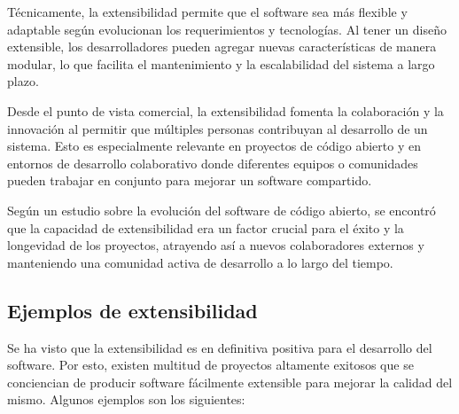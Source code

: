 Técnicamente, la extensibilidad permite que el software sea más flexible y adaptable según evolucionan los requerimientos y tecnologías. Al tener un diseño extensible, los desarrolladores pueden agregar nuevas características de manera modular, lo que facilita el mantenimiento y la escalabilidad del sistema a largo plazo.

Desde el punto de vista comercial, la extensibilidad fomenta la colaboración y la innovación al permitir que múltiples personas contribuyan al desarrollo de un sistema. Esto es especialmente relevante en proyectos de código abierto y en entornos de desarrollo colaborativo donde diferentes equipos o comunidades pueden trabajar en conjunto para mejorar un software compartido.

Según un estudio \citep{mockus2002two} sobre la evolución del software de código abierto, se encontró que la capacidad de extensibilidad era un factor crucial para el éxito y la longevidad de los proyectos, atrayendo así a nuevos colaboradores externos y manteniendo una comunidad activa de desarrollo a lo largo del tiempo.

\subsection{Ejemplos de extensibilidad}

Se ha visto que la extensibilidad es en definitiva positiva para el desarrollo del software. Por esto, existen multitud de proyectos altamente exitosos que se conciencian de producir software fácilmente extensible para mejorar la calidad del mismo. Algunos ejemplos son los siguientes:

